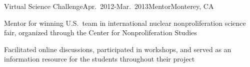 
\begin{rSubsection}{Virtual Science Challenge}{Apr.\ 2012-Mar.\ 2013}{Mentor}{Monterey, CA}
\item Mentor for winning U.S.\ team in international nuclear nonproliferation science fair, organized through the Center for Nonproliferation Studies
\item Facilitated online discussions, participated in workshops, and served as an information resource for the students throughout their project
\end{rSubsection}

%
